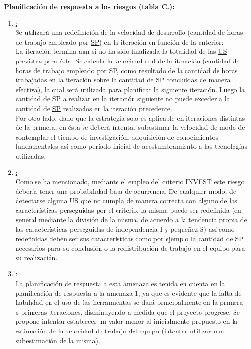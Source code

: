 \documentclass[a4paper, 12pt,twoside]{report}  %
\numberwithin{equation}{subsection} %
\begin{document}
\textbf{Planificación de respuesta a los riesgos (tabla \hyperref[tabla_riesgos]{C.\tempTblRiesgos}):}
\begin{enumerate}
	\item \underline{\hypertarget{planificacion_respuesta_riesgo_uno}{}:}\\
	Se utilizará una redefinición de la velocidad de desarrollo (cantidad de horas de trabajo empleado por \hyperlink{SP}{SP}) en la iteración en función de la anterior:\\
	La iteración termina aún si no ha sido finalizada la totalidad de las \hyperlink{US}{US} previstas para ésta. Se calcula la velocidad real de la iteración (cantidad de horas de trabajo empleado por \hyperlink{SP}{SP}, como resultado de la cantidad de horas trabajadas en la iteración sobre la cantidad de \hyperlink{SP}{SP} concluidas de manera efectiva), la cual será utilizada para planificar la siguiente iteración. Luego la cantidad de \hyperlink{SP}{SP} a realizar en la iteración siguiente no puede exceder a la cantidad de \hyperlink{SP}{SP} realizados en la iteración precedente.\\
	\indent Por otro lado, dado que la estrategia solo es aplicable en iteraciones distintas de la primera, en ésta se deberá intentar subestimar la velocidad de modo de contemplar el tiempo de investigación, adquisición de conocimientos fundamentales así como período inicial de acostumbramiento a las tecnologías utilizadas.
	\item \underline{:}\\
	Como se ha mencionado, mediante el empleo del criterio \hyperlink{INVEST}{INVEST} este riesgo debería tener una probabilidad baja de ocurrencia. De cualquier modo, de detectarse alguna \hyperlink{US}{US} que no cumpla de manera correcta con alguno de las características perseguidas por el criterio, la misma puede ser redefinida (en general mediante la división de la misma, de acuerdo a la tendencia propia de las características perseguidas de independencia I y pequeñez S) así como redefinidas deben ser sus características como por ejemplo la cantidad de \hyperlink{SP}{SP} necesarios para su conclusión o la redistribución de trabajo en el equipo para su realización.
	\item \underline{:}\\
	La planificación de respuesta a esta amenaza es tenida en cuenta en la planificación de respuesta a la amenaza 1, ya que es evidente que la falta de habilidad en el uso de las herramientas se dará principalmente en la primera o primeras iteraciones, disminuyendo a medida que el proyecto progrese. Se propone intentar establecer un valor menor al inicialmente propuesto en la estimación de la velocidad de trabajo del equipo (intentar utilizar una subestimación de la misma).

\end{enumerate}
\end{document}

